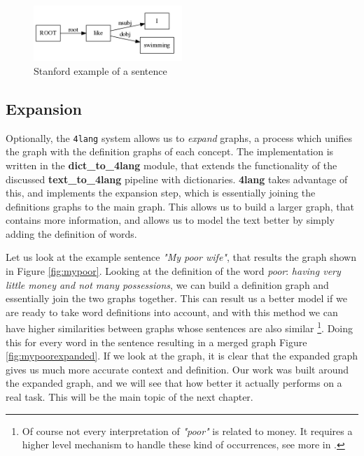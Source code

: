 \begin{figure}[h]
	\centering
	\includegraphics[width=0.5\textwidth]{figures/swimmingdep}
	\caption{Stanford example of a sentence}
	\label{fig:swimmingdep}
\end{figure}


\subsection{Expansion}
Optionally, the \texttt{4lang} system allows us to \textit{expand}
graphs, a process which unifies the graph with the definition graphs of
each concept. The implementation is written in the \textbf{dict\_to\_4lang} module, that extends the functionality of the discussed \textbf{text\_to\_4lang} pipeline with dictionaries. \textbf{4lang} takes advantage of this, and implements the expansion step, which is essentially joining the definitions graphs to the main graph. This allows us to build a larger graph, that contains more information, and allows us to model the text better by simply adding the definition of words.

Let us look at the example sentence \textit{"My poor wife"}, that results the graph shown in Figure \ref{fig:mypoor}. Looking at the definition of the word \textit{poor}: \textit{having very little money and not many possessions}, we can build a definition graph and essentially join the two graphs together. This can result us a better model if we are ready to take word definitions into account, and with this method we can have higher similarities between graphs whose sentences are also similar \footnote{Of course not every interpretation of \textit{"poor"} is related to money. It requires a higher level mechanism to handle these kind of occurrences, see more in \cite{Kornai:2018}.}. Doing this for every word in the sentence resulting in a merged graph Figure \ref{fig:mypoorexpanded}. If we look at the graph, it is clear that the expanded graph gives us much more accurate context and definition. Our work was built around the expanded graph, and we will see that how better it actually performs on a real task. This will be the main topic of the next chapter.

